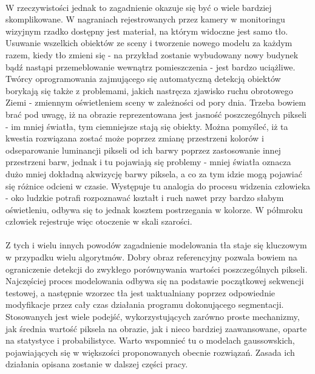 \paragraph{}
W rzeczywistości jednak to zagadnienie okazuje się być o wiele bardziej skomplikowane. W nagraniach rejestrowanych przez kamery w monitoringu wizyjnym rzadko dostępny jest materiał, na którym widoczne jest samo tło. Usuwanie wszelkich obiektów ze sceny i tworzenie nowego modelu za każdym razem, kiedy tło zmieni się - na przykład zostanie wybudowany nowy budynek bądź nastąpi przemeblowanie wewnątrz pomieszczenia - jest bardzo uciążliwe. Twórcy oprogramowania zajmującego się automatyczną detekcją obiektów borykają się także z problemami, jakich nastręcza zjawisko ruchu obrotowego Ziemi - zmiennym oświetleniem sceny w zależności od pory dnia. Trzeba bowiem brać pod uwagę, iż na obrazie reprezentowana jest jasność poszczególnych pikseli - im mniej światła, tym ciemniejsze stają się obiekty. Można pomyśleć, iż ta kwestia rozwiązana zostać może poprzez zmianę przestrzeni kolorów i odseparowanie luminancji pikseli od ich barwy poprzez zastosowanie innej przestrzeni barw, jednak i tu pojawiają się problemy - mniej światła oznacza dużo mniej dokładną akwizycję barwy piksela, a co za tym idzie mogą pojawiać się różnice odcieni w czasie. Występuje tu analogia do procesu widzenia człowieka - oko ludzkie potrafi rozpoznawać kształt i ruch nawet przy bardzo słabym oświetleniu, odbywa się to jednak kosztem postrzegania w kolorze. W półmroku człowiek rejestruje więc otoczenie w skali szarości.
\paragraph{}
Z tych i wielu innych powodów zagadnienie modelowania tła staje się kluczowym w przypadku wielu algorytmów. Dobry obraz referencyjny pozwala bowiem na ograniczenie detekcji do zwykłego porównywania wartości poszczególnych pikseli. Najczęściej proces modelowania odbywa się na podstawie początkowej sekwencji testowej, a następnie wzorzec tła jest uaktualniany poprzez odpowiednie modyfikacje przez cały czas działania programu dokonującego segmentacji. Stosowanych jest wiele podejść, wykorzystujących zarówno proste mechanizmy, jak średnia wartość piksela na obrazie, jak i nieco bardziej zaawansowane, oparte na statystyce i probabilistyce. Warto wspomnieć tu o modelach gaussowskich, pojawiających się w większości proponowanych obecnie rozwiązań. Zasada ich działania opisana zostanie w dalszej części pracy.
